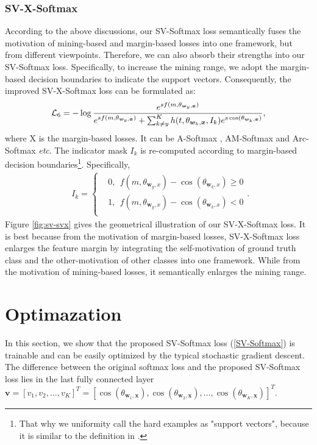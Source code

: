 \documentclass[10pt,twocolumn,letterpaper]{article}
\begin{document}
\subsubsection{SV-X-Softmax}
According to the above discussions, our SV-Softmax loss semantically fuses the motivation of mining-based and margin-based losses into one framework, but from different viewpoints. Therefore, we can also absorb their strengths into our SV-Softmax loss. Specifically, to increase the mining range, we adopt the margin-based decision boundaries to indicate the support vectors. Consequently, the improved SV-X-Softmax loss can be formulated as:
\begin{equation}\label{SV-X-Softmax}
\noindent \mathcal{L}_6 = -\log  \frac{e^{sf(m,\theta_{\bm{w}_y,\bm{x}})}}{e^{sf(m,\theta_{\bm{w}_y,\bm{x}})}+\sum_{k\neq y}^K h(t,\theta_{\bm{w}_k,\bm{x}},I_k)e^{s\cos(\theta_{\bm{w}_k,\bm{x}})}},
\end{equation}
where X is the margin-based losses. It can be A-Softmax \cite{SphereFace}, AM-Softmax \cite{AM-Softmax} and Arc-Softmax \cite{Arc-Softmax} \textit{etc}. The indicator mask $I_k$ is re-computed according to margin-based decision boundaries\footnote{That why we uniformity call the hard examples as "support vectors", because it is similar to the definition in \cite{cortes1995support}.}. Specifically,
\begin{equation}\label{weightX}
\begin{aligned}
\ \  {I}_k =
 \left \{
   \begin{aligned}
  & 0,  \ \ f(m,\theta_{\bm{w}_y,x})-\cos(\theta_{\bm{w}_k,x})\geq 0 \\
  & 1, \ \ f(m,\theta_{\bm{w}_y,x})-\cos(\theta_{\bm{w}_k,x})< 0\\
   \end{aligned}
\right. .
\end{aligned}
\end{equation}
Figure \ref{fig:sv-svx} gives the geometrical illustration of our SV-X-Softmax loss. It is best because from the motivation of margin-based losses, SV-X-Softmax loss enlarges the feature margin by integrating the self-motivation of ground truth class and the other-motivation of other classes into one framework. While from the motivation of mining-based losses, it semantically enlarges the mining range.

\section{Optimazation}
In this section, we show that the proposed SV-Softmax loss (\ref{SV-Softmax}) is trainable and can be easily optimized by the typical stochastic gradient descent. The difference between the original softmax loss and the proposed SV-Softmax loss lies in the last fully connected layer
$\bm{v}=[v_1,v_2,\dots,v_K]^T=[\cos(\theta_{\bm{w}_1,\bm{x}}),\cos(\theta_{\bm{w}_2,\bm{x}}),\dots,\cos(\theta_{\bm{w}_K,\bm{x}})]^T$.
\end{document}
